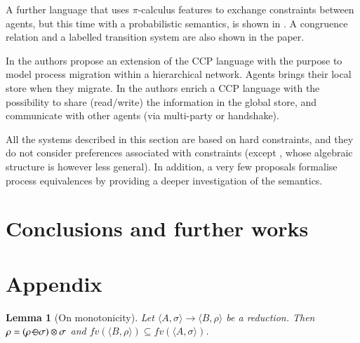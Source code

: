 \documentclass[preprint,12pt]{elsarticle}
\newtheorem{lemma}{Lemma}
\def\odiv{\, {\ominus\hspace{-7.7pt} \div} \,}
\begin{document}
A further language that uses $\pi$-calculus features to exchange constraints between agents, but this time with a probabilistic semantics, is shown in \cite{bortolussi}. A congruence relation and a labelled transition system are also shown in the paper. 

In \cite{catuscia} the authors propose an extension of the CCP language with the purpose to model process migration within a hierarchical network. Agents brings their local store when they migrate. In \cite{lubos} the authors enrich a CCP language with the possibility to share (read/write) the information in the global store, and communicate with other agents (via multi-party or handshake).

All the systems described in this section are based on hard constraints, and  they do not consider preferences associated with constraints (except \cite{buscemi}, whose algebraic structure is however less general). In addition, a very few proposals formalise process equivalences by providing a deeper investigation of the semantics.





\section{Conclusions and further works}\label{sec:conclusion}











	\section*{Appendix}
	
	\setcounter{lemma}{7}
	\begin{lemma}[On monotonicity]
		\label{rmono}
		Let $\langle A, \sigma \rangle \rightarrow \langle B, \rho \rangle$ be a reduction. 
		Then $\rho = (\rho \odiv \sigma) \otimes \sigma$ and $fv(\langle B, \rho \rangle) \subseteq fv(\langle A, \sigma \rangle)$.
	\end{lemma}
	
\end{document}

